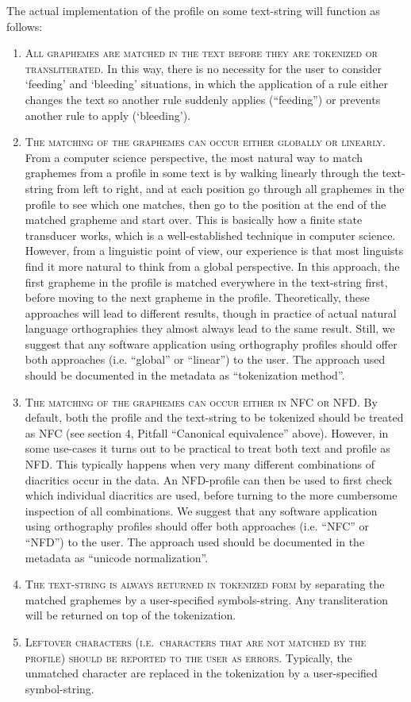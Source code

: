 The actual implementation of the profile on some text-string will function as follows:
\begin{enumerate}
	\def\labelenumi{\arabic{enumi}.} 
	\item \textsc{All graphemes are matched in the text before they are tokenized or transliterated}. In this way, there is no necessity for the user to consider `feeding' and `bleeding' situations, in which the application of a rule either changes the text so another rule suddenly applies (``feeding'') or prevents another rule to apply (`bleeding'). 
	\item \textsc{The matching of the graphemes can occur either globally or linearly. }From a computer science perspective, the most natural way to match graphemes from a profile in some text is by walking linearly through the text-string from left to right, and at each position go through all graphemes in the profile to see which one matches, then go to the position at the end of the matched grapheme and start over. This is basically how a finite state transducer works, which is a well-established technique in computer science. However, from a linguistic point of view, our experience is that most linguists find it more natural to think from a global perspective. In this approach, the first grapheme in the profile is matched everywhere in the text-string first, before moving to the next grapheme in the profile. Theoretically, these approaches will lead to different results, though in practice of actual natural language orthographies they almost always lead to the same result. Still, we suggest that any software application using orthography profiles should offer both approaches (i.e. ``global'' or ``linear'') to the user. The approach used should be documented in the metadata as ``tokenization method''. 
	\item \textsc{The matching of the graphemes can occur either in NFC or NFD. }By default, both the profile and the text-string to be tokenized should be treated as NFC (see section 4, Pitfall ``Canonical equivalence'' above). However, in some use-cases it turns out to be practical to treat both text and profile as NFD. This typically happens when very many different combinations of diacritics occur in the data. An NFD-profile can then be used to first check which individual diacritics are used, before turning to the more cumbersome inspection of all combinations. We suggest that any software application using orthography profiles should offer both approaches (i.e. ``NFC'' or ``NFD'') to the user. The approach used should be documented in the metadata as ``unicode normalization''. 
	\item \textsc{The text-string is always returned in tokenized form} by separating the matched graphemes by a user-specified symbols-string. Any transliteration will be returned on top of the tokenization. 
	\item \textsc{Leftover characters (i.e.~characters that are not matched by the profile) should be reported to the user as errors.} Typically, the unmatched character are replaced in the tokenization by a user-specified symbol-string. 
\end{enumerate}


